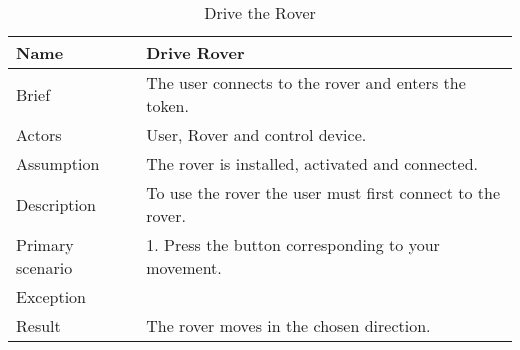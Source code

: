 	\begin{table}[htb]
		\centering
		\caption{Drive the Rover}
		\begin{tabularx}{\textwidth}{|l|X|}
			\hline
			Name             & Drive Rover                                                \\ \hline
			Brief            & The user connects to the rover and enters the token.       \\ \hline
			Actors           & User, Rover and control device.                            \\ \hline
			Assumption       & The rover is installed, activated and connected.            \\ \hline
			Description      & To use the rover the user must first connect to the rover. \\ \hline
			Primary scenario & 1. Press the button corresponding to your movement.        \\ \hline
			Exception        &                                                            \\ \hline
			Result           & The rover moves in the chosen direction.                   \\ \hline
		\end{tabularx}
	\end{table}